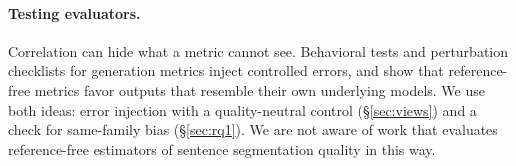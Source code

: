 \paragraph{Testing evaluators.} Correlation can hide what a metric cannot see. Behavioral tests
\citep{ribeiro-etal-2020-beyond} and perturbation checklists for generation metrics \citep{sai-etal-2021-perturbation}
inject controlled errors, and \citet{deutsch-etal-2022-limitations} show that reference-free metrics favor outputs that
resemble their own underlying models. We use both ideas: error injection with a quality-neutral control
(\S\ref{sec:views}) and a check for same-family bias (\S\ref{sec:rq1}). We are not aware of work that evaluates
reference-free estimators of sentence segmentation quality in this way.
